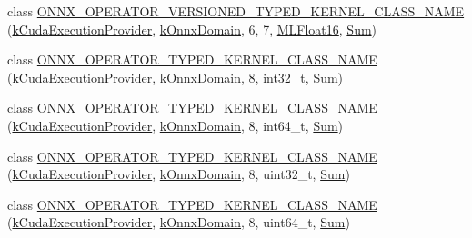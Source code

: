 \begin{DoxyCompactItemize}
\item 
class \mbox{\hyperlink{namespaceonnxruntime_1_1cuda_a1ae0efea3f785f7ec62e386bed42a514}{O\+N\+N\+X\+\_\+\+O\+P\+E\+R\+A\+T\+O\+R\+\_\+\+V\+E\+R\+S\+I\+O\+N\+E\+D\+\_\+\+T\+Y\+P\+E\+D\+\_\+\+K\+E\+R\+N\+E\+L\+\_\+\+C\+L\+A\+S\+S\+\_\+\+N\+A\+ME}} (\mbox{\hyperlink{namespaceonnxruntime_a73ebc64887ddd1968e3cef47ffefe35b}{k\+Cuda\+Execution\+Provider}}, \mbox{\hyperlink{namespaceonnxruntime_ac0e7c0c106a2c9e9594560a3ab289fa0}{k\+Onnx\+Domain}}, 6, 7, \mbox{\hyperlink{uniononnxruntime_1_1MLFloat16}{M\+L\+Float16}}, \mbox{\hyperlink{classonnxruntime_1_1cuda_1_1Sum}{Sum}})
\item 
class \mbox{\hyperlink{namespaceonnxruntime_1_1cuda_ac8c7bca9f24e8474521ca159865de130}{O\+N\+N\+X\+\_\+\+O\+P\+E\+R\+A\+T\+O\+R\+\_\+\+T\+Y\+P\+E\+D\+\_\+\+K\+E\+R\+N\+E\+L\+\_\+\+C\+L\+A\+S\+S\+\_\+\+N\+A\+ME}} (\mbox{\hyperlink{namespaceonnxruntime_a73ebc64887ddd1968e3cef47ffefe35b}{k\+Cuda\+Execution\+Provider}}, \mbox{\hyperlink{namespaceonnxruntime_ac0e7c0c106a2c9e9594560a3ab289fa0}{k\+Onnx\+Domain}}, 8, int32\+\_\+t, \mbox{\hyperlink{classonnxruntime_1_1cuda_1_1Sum}{Sum}})
\item 
class \mbox{\hyperlink{namespaceonnxruntime_1_1cuda_a4ca9a62ad46073885bc911b24035fc59}{O\+N\+N\+X\+\_\+\+O\+P\+E\+R\+A\+T\+O\+R\+\_\+\+T\+Y\+P\+E\+D\+\_\+\+K\+E\+R\+N\+E\+L\+\_\+\+C\+L\+A\+S\+S\+\_\+\+N\+A\+ME}} (\mbox{\hyperlink{namespaceonnxruntime_a73ebc64887ddd1968e3cef47ffefe35b}{k\+Cuda\+Execution\+Provider}}, \mbox{\hyperlink{namespaceonnxruntime_ac0e7c0c106a2c9e9594560a3ab289fa0}{k\+Onnx\+Domain}}, 8, int64\+\_\+t, \mbox{\hyperlink{classonnxruntime_1_1cuda_1_1Sum}{Sum}})
\item 
class \mbox{\hyperlink{namespaceonnxruntime_1_1cuda_a235bc9c67f675609485705e8ded11dff}{O\+N\+N\+X\+\_\+\+O\+P\+E\+R\+A\+T\+O\+R\+\_\+\+T\+Y\+P\+E\+D\+\_\+\+K\+E\+R\+N\+E\+L\+\_\+\+C\+L\+A\+S\+S\+\_\+\+N\+A\+ME}} (\mbox{\hyperlink{namespaceonnxruntime_a73ebc64887ddd1968e3cef47ffefe35b}{k\+Cuda\+Execution\+Provider}}, \mbox{\hyperlink{namespaceonnxruntime_ac0e7c0c106a2c9e9594560a3ab289fa0}{k\+Onnx\+Domain}}, 8, uint32\+\_\+t, \mbox{\hyperlink{classonnxruntime_1_1cuda_1_1Sum}{Sum}})
\item 
class \mbox{\hyperlink{namespaceonnxruntime_1_1cuda_a007c400f90dc448b3d6f461b30bc7729}{O\+N\+N\+X\+\_\+\+O\+P\+E\+R\+A\+T\+O\+R\+\_\+\+T\+Y\+P\+E\+D\+\_\+\+K\+E\+R\+N\+E\+L\+\_\+\+C\+L\+A\+S\+S\+\_\+\+N\+A\+ME}} (\mbox{\hyperlink{namespaceonnxruntime_a73ebc64887ddd1968e3cef47ffefe35b}{k\+Cuda\+Execution\+Provider}}, \mbox{\hyperlink{namespaceonnxruntime_ac0e7c0c106a2c9e9594560a3ab289fa0}{k\+Onnx\+Domain}}, 8, uint64\+\_\+t, \mbox{\hyperlink{classonnxruntime_1_1cuda_1_1Sum}{Sum}})

\end{DoxyCompactItemize}
